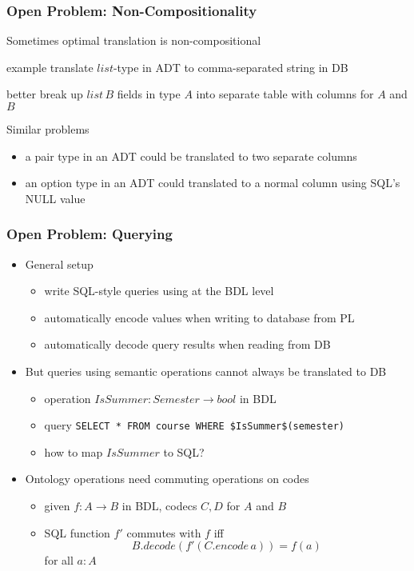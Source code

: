 \begin{frame}\frametitle{Open Problem: Non-Compositionality}
\begin{blockitems}{Sometimes optimal translation is non-compositional}
\item example translate $list$-type in ADT to comma-separated string in DB
\item better break up $list\,B$ fields in type $A$ into separate table with columns for $A$ and $B$
\end{blockitems}

Similar problems
\begin{itemize}
\item a pair type in an ADT could be translated to two separate columns
\item an option type in an ADT could translated to a normal column using SQL's NULL value
\end{itemize}
\end{frame}

\begin{frame}\frametitle{Open Problem: Querying}
\begin{itemize}
\item General setup
 \begin{itemize}
 \item write SQL-style queries using at the BDL level
 \item automatically encode values when writing to database from PL
 \item automatically decode query results when reading from DB
 \end{itemize}
\item But queries using semantic operations cannot always be translated to DB
 \begin{itemize}
  \item operation $IsSummer: Semester \to bool$ in BDL
  \item query \lstinline|SELECT * FROM course WHERE $IsSummer$(semester)|
  \item how to map $IsSummer$ to SQL?
 \end{itemize}
\item Ontology operations need commuting operations on codes
\begin{itemize}
\item given $f: A\to B$ in BDL, codecs $C,D$ for $A$ and $B$
\item SQL function $f'$ commutes with $f$ iff \\
  \[B.decode (f'(C.encode\,a)) = f(a)\]
  for all $a:A$
\end{itemize}
\end{itemize}
\end{frame}

